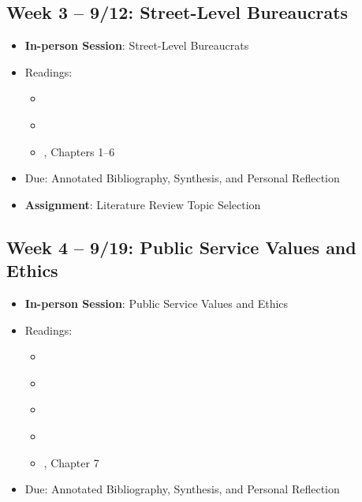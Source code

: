 \documentclass[12pt, letterpaper]{article}
\begin{document}
\subsection*{Week 3 -- 9/12: Street-Level Bureaucrats}
\begin{itemize}
    \item \textbf{In-person Session}: Street-Level Bureaucrats
    \item Readings:
    \begin{itemize}
        \item \cite{Lipsky1980}
        \item \cite{MaynardMoody2012}
        \item \cite{Lipsky2010}, Chapters 1--6
    \end{itemize}
\item Due: Annotated Bibliography, Synthesis, and Personal Reflection
\item \textbf{Assignment}: Literature Review Topic Selection
\end{itemize}

\subsection*{Week 4 -- 9/19: Public Service Values and Ethics}
\begin{itemize}
    \item \textbf{In-person Session}: Public Service Values and Ethics
    \item Readings:
    \begin{itemize}
        \item \cite{friedrich1935responsible}
        \item \cite{FINER1941}
        \item \cite{Frederickson2005}
        \item \cite{Adams2009}
        \item \cite{Denhardt2015}, Chapter 7
    \end{itemize}
    \item Due: Annotated Bibliography, Synthesis, and Personal Reflection
\end{itemize}
\end{document}
